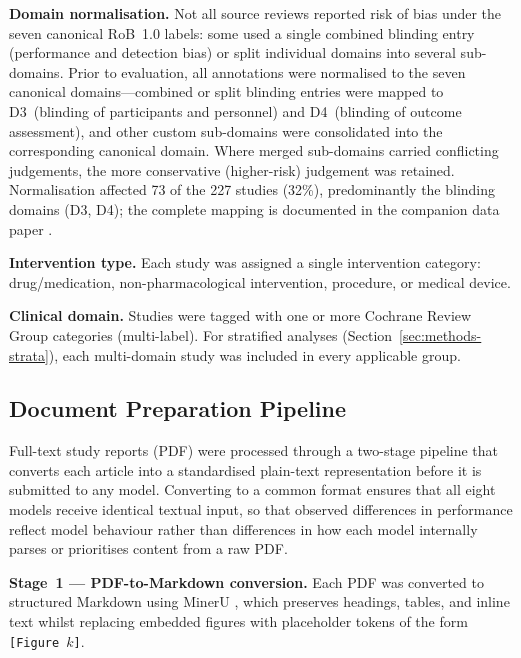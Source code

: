 \documentclass[../main.tex]{subfiles}
\begin{document}
\textbf{Domain normalisation.}
Not all source reviews reported risk of bias under the seven canonical RoB~1.0
labels: some used a single combined blinding entry (performance and detection
bias) or split individual domains into several sub-domains.
Prior to evaluation, all annotations were normalised to the seven canonical
domains---combined or split blinding entries were mapped to D3~(blinding of
participants and personnel) and D4~(blinding of outcome assessment), and other
custom sub-domains were consolidated into the corresponding canonical domain.
Where merged sub-domains carried conflicting judgements, the more conservative
(higher-risk) judgement was retained.
Normalisation affected 73 of the 227 studies (32\%), predominantly the blinding
domains (D3, D4); the complete mapping is documented in the companion data
paper \citep{Dataset2026}.

\textbf{Intervention type.}
Each study was assigned a single intervention category:
drug/medication, non-pharmacological intervention, procedure, or medical device.

\textbf{Clinical domain.}
Studies were tagged with one or more Cochrane Review Group categories
(multi-label).
For stratified analyses (Section~\ref{sec:methods-strata}), each multi-domain
study was included in every applicable group.

\subsection{Document Preparation Pipeline}
\label{sec:pipeline}

Full-text study reports (PDF) were processed through a two-stage pipeline
that converts each article into a standardised plain-text representation
before it is submitted to any model.
Converting to a common format ensures that all eight models receive identical
textual input, so that observed differences in performance reflect model
behaviour rather than differences in how each model internally parses or
prioritises content from a raw PDF.

\textbf{Stage~1 --- PDF-to-Markdown conversion.}
Each PDF was converted to structured Markdown using MinerU \citep{Wang2024MinerU},
which preserves headings, tables, and inline text whilst replacing embedded figures
with placeholder tokens of the form \texttt{[Figure~$k$]}.
\end{document}
